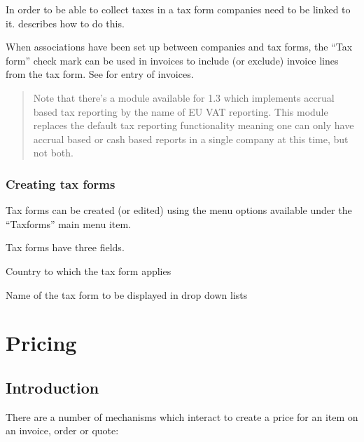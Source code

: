 In order to be able to collect taxes in a tax form companies need to be
linked to it.  describes how to do this.

When associations have been set up between companies and
tax forms, the ``Tax form'' check mark can be used in invoices to include
(or exclude) invoice lines from the tax form. See 
for entry of invoices.

\begin{quote}
Note that there's a module available for 1.3 which implements accrual based tax reporting by
the name of EU VAT reporting. This module replaces the default tax reporting functionality
meaning one can only have accrual based or cash based reports in a single company at this time,
but not both.
\end{quote}

\subsection{Creating tax forms}
\label{subsec-tax-taxforms-creation}

Tax forms can be created (or edited) using the menu options available under the
``Taxforms'' main menu item.

Tax forms have three fields.

\begin{description}[style=nextline]
\item [Country] Country to which the tax form applies
\item [Description] Name of the tax form to be displayed in drop down lists
\item [Select by Default] %
\end{description}



\chapter{Pricing}
\label{cha-pricing}

\section{Introduction}
\label{sec-pricing-introduction}

There are a number of mechanisms which interact to create a price for an item
on an invoice, order or quote:

